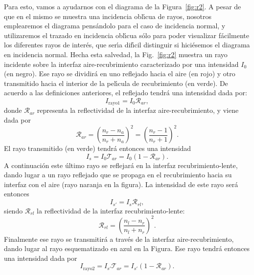 \documentclass[a4paper]{article}
\begin{document}
Para esto, vamos a ayudarnos con el diagrama de la Figura~\ref{fig:r2}. 
A pesar de que en el mismo se muestra una incidencia obl\'\i cua de rayos,
nosotros emplearemos el diagrama pens\'andolo para el caso de incidencia
normal, y utilizaremos el trazado en incidencia obl\'\i cua s\'olo para 
poder visualizar f\'acilmente los diferentes rayos de inter\'es, que 
ser\'\i a dif\'\i cil distinguir si hici\'esemos el diagrama en 
incidencia normal. Hecha esta salvedad, la Fig.~\ref{fig:r2} muestra 
un rayo incidente sobre la interfaz aire-recubrimiento
caracterizado por una intensidad $I_0$ (en negro). Ese rayo se 
dividir\'a en uno reflejado hacia el aire (en rojo) 
y otro transmitido hacia el interior de la pel\'\i cula de recubrimiento
(en verde).  
De acuerdo a las definiciones anteriores, el reflejado tendr\'a una intensidad
dada por:
\begin{equation}
    I_\text{rayo1} = I_0 \mathcal{R}_{ar},
\end{equation}
donde $\mathcal{R}_{ar}$ representa la reflectividad de la interfaz 
aire-recubrimiento, y viene dada por
\begin{equation}
    \mathcal{R}_{ar} = \left( \frac{n_r-n_a}{n_r + n_a} \right)^2 =
    \left( \frac{n_r-1}{n_r + 1} \right)^2. 
\end{equation}
El rayo transmitido (en verde) tendr\'a entonces una intensidad
\begin{equation}
    I_s = I_0 \mathcal{T}_{ar} = I_0 \left(1 - \mathcal{R}_{ar}\right).
\end{equation}
A continuaci\'on este \'ultimo rayo se reflejar\'a en la interfaz
recubrimiento-lente, dando lugar a un rayo reflejado que se propaga
en el recubrimiento hacia su interfaz con el aire (rayo naranja en 
la figura). La intensidad de este rayo ser\'a entonces
\begin{equation}
    I_{s'} = I_s \mathcal{R}_{rl},
\end{equation}
siendo $\mathcal{R}_{rl}$ la reflectividad de la interfaz 
recubrimiento-lente:
\begin{equation}
    \mathcal{R}_{rl} = \left( \frac{n_l-n_r}{n_l + n_r} \right)^2.
\end{equation}
Finalmente ese rayo se transmitir\'a a trav\'es de la interfaz 
aire-recubrimiento, dando lugar al rayo esquematizado en azul en la
Figura. Ese rayo tendr\'a entonces una intensidad dada por
\begin{equation}
    I_\text{rayo2} = I_{s'} \mathcal{T}_{ar} = I_{s'} \left( 
    1 - \mathcal{R}_{ar}\right).
\end{equation}
\end{document}
